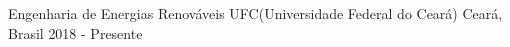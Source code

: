 

\begin{cventries}

  \cventry
    {Engenharia de Energias Renováveis} %
    {UFC(Universidade Federal do Ceará)} %
    {Ceará, Brasil} %
    {2018 - Presente} %
    {
      \begin{cvitems} %
      \end{cvitems}
    }

\end{cventries}
